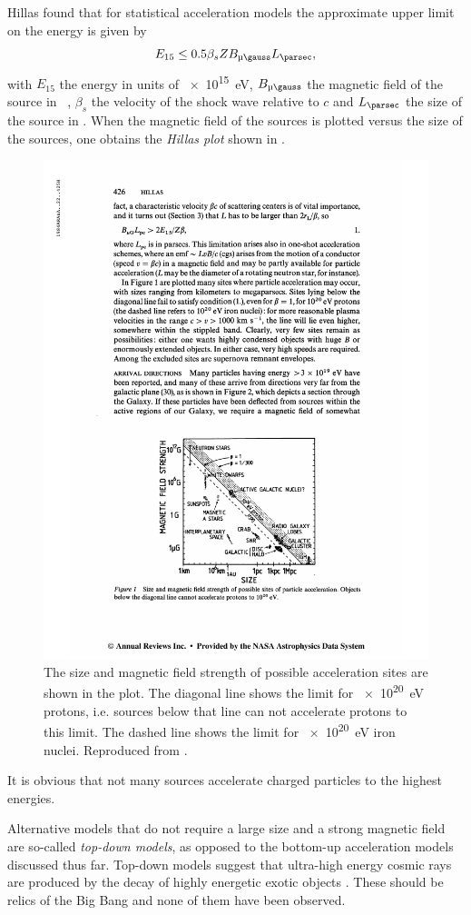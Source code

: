 Hillas found \cite{Hillas:1984} that for statistical acceleration models the
approximate upper limit on the energy is given by
\begin{equation}
E_{15} \leq 0.5 \beta_s Z B_{\si{\micro\gauss}} L_{\si{\parsec}},
\end{equation}
with $E_{15}$ the energy in units of \SI{e15}{\electronvolt},
$B_{\si{\micro\gauss}}$ the magnetic field of the source in \si{\micro\gauss},
$\beta_s$ the velocity of the shock wave relative to $c$ and
$L_{\si{\parsec}}$ the size of the source in \si{\parsec}.  When the
magnetic field of the sources is plotted versus the size of the sources,
one obtains the \emph{Hillas plot} shown in .
\begin{figure}
\centering
\includegraphics[width=.7\linewidth]{raw-plots/Hillas-plot}
\caption{  The size and magnetic field strength of
possible acceleration sites are shown in the plot.  The diagonal line shows the limit
for \SI{e20}{\electronvolt} protons, i.e. sources below that line can not
accelerate protons to this limit.  The dashed line shows the limit for
\SI{e20}{\electronvolt} iron nuclei.  Reproduced from \cite{Hillas:1984}.}
\label{fig:Hillas}
\end{figure}
It is obvious that not many sources accelerate charged particles to the
highest energies.

Alternative models that do not require a large size and a strong
magnetic field are so-called \emph{top-down models}, as opposed to the
bottom-up acceleration models discussed thus far.  Top-down models suggest that
ultra-high energy cosmic rays are produced by the decay of highly energetic
exotic objects \cite{Olinto:2000}.  These should be relics of the
Big Bang and none of them have been observed.


